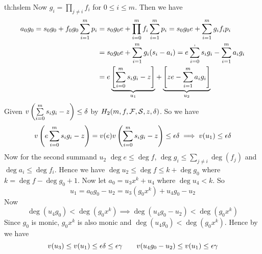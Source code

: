 \begin{proof-of-theorem}{th:hslem}
	Now $g_i=\prod\limits_{j\neq i}f_i$ for $0\leq i\leq m$.  Then  we have \begin{align*}
		a_0g_0=s_0g_0+f_0g_0\sum_{i=1}^mp_i & = s_0g_0e+\prod_{i=0}^mf_i \sum_{i=1}^mp_i = s_0g_0e+\sum_{i=1}^m g_if_ip_i\\
		& = s_0g_0e+\sum_{i=1}^m g_i(s_i-a_i) = e\sum_{i=0}^, s_ig_i-\sum_{i=1}^ma_ig_i\\
		& =e\underbrace{\left[ \sum_{i=0}^ms_ig_i-z \right]}_{u_1}+\underbrace{\left[ ze-\sum_{i=1}^ma_ig_i \right]}_{u_2}
	\end{align*}
Given $v\left(  \sum\limits_{i=0}^ms_ig_i-z\right)\leq \delta$ by $H_2(m,f,\mathcal{F},\mathcal{S},z,\delta)$. So we have $$v\left(  e\sum\limits_{i=0}^ms_ig_i-z\right)=v(e)v\left(  \sum\limits_{i=0}^ms_ig_i-z\right)\leq \epsilon\delta\implies v(u_1)\leq \epsilon\delta$$Now for the second summand $u_2$ $\deg e\leq \deg f$, $\deg g_i\leq \sum\limits_{j\neq i}\deg(f_j)$ and $\deg a_i\leq \deg f_i$. Hence we have $\deg u_2\leq \deg f\leq k+\deg g_0$ where $k=\deg f-\deg g_0+1$.  Now let $a_0=u_3x^k+u_4$ where $\deg u_4<k$. So $$u_1=a_0g_0-u_2=u_3(g_0x^k)+u_4g_0-u_2$$ Now $$\deg (u_4g_0)<\deg (g_0x^k)\implies \deg(u_4g_0-u_2)<\deg(g_0x^k)$$Since $g_0$ is monic, $g_0x^k$ is also monic and $\deg(u_4g_0)<\deg (g_0x^k)$. Hence by  we have $$v(u_3)\leq v(u_1)\leq \epsilon\delta\leq \epsilon \gamma\qquad v(u_4g_0-u_2)\leq v(u_1)\leq \epsilon\gamma$$
	
\end{proof-of-theorem}